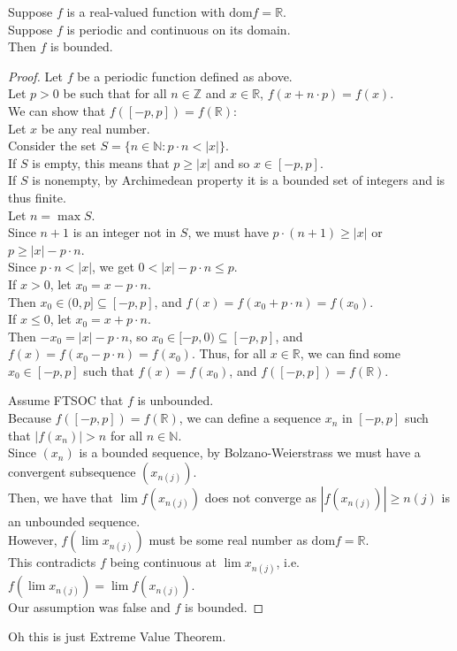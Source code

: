 \documentclass{article}
\newenvironment{theorem}[1]{\renewcommand\theinnercustomthm{#1}\innercustomthm}
  {\endinnercustomthm}
\begin{document}
\newpage{}
\begin{theorem}{6}
    Suppose $f$ is a real-valued function with $\mathrm{dom}f = \mathbb R$. \\
    Suppose $f$ is periodic and continuous on its domain. \\
    Then $f$ is bounded.
\end{theorem}
\begin{proof}
    Let $f$ be a periodic function defined as above. \\
    Let $p > 0$ be such that for all $n \in \mathbb Z$ and $x \in \mathbb R$, $f(x+n \cdot p) = f(x)$. \\
    We can show that $f([-p,p]) = f(\mathbb R)$: \\
    Let $x$ be any real number. \\
    Consider the set $S = \{ n \in \mathbb N : p\cdot n < |x|\}$. \\
    If $S$ is empty, this means that $p \ge |x|$ and so $x \in [-p, p]$. \\
    If $S$ is nonempty, by Archimedean property it is a bounded set of integers and is thus finite. \\
    Let $n = \max S$. \\
    Since $n+1$ is an integer not in $S$, we must have $p\cdot(n+1)\ge |x|$ or $p \ge |x| - p\cdot n$. \\
    Since $p \cdot n < |x|$, we get $0 <|x|-p\cdot n \le p$. \\
    If $x>0$, let $x_0 = x - p\cdot n$. \\
    Then $x_0 \in (0,p] \subseteq [-p,p]$, and $f(x)=f(x_0+p\cdot n)=f(x_0)$. \\
    If $x \le 0$, let $x_0 = x+p\cdot n$. \\
    Then $-x_0 = |x|-p\cdot n$, so $x_0 \in [-p,0) \subseteq [-p,p]$, and $f(x)=f(x_0-p\cdot n)=f(x_0)$.
    Thus, for all $x\in \mathbb R$, we can find some $x_0 \in [-p,p]$ such that $f(x)=f(x_0)$, and $f([-p,p]) = f(\mathbb R)$.
    
    Assume FTSOC that $f$ is unbounded. \\
    Because $f([-p,p]) = f(\mathbb R)$, we can define a sequence $x_n$ in $[-p,p]$ such that $|f(x_n)|>n$ for all $n \in \mathbb N$. \\
    Since $(x_n)$ is a bounded sequence, by Bolzano-Weierstrass we must have a convergent subsequence $(x_{n(j)})$. \\
    Then, we have that $\lim f(x_{n(j)})$ does not converge as $|f(x_{n(j)})| \ge n(j)$ is an unbounded sequence. \\
    However, $f(\lim x_{n(j)})$ must be some real number as $\mathrm{dom} f = \mathbb R$. \\
    This contradicts $f$ being continuous at $\lim x_{n(j)}$, i.e. $f(\lim x_{n(j)}) = \lim f(x_{n(j)})$. \\
    Our assumption was false and $f$ is bounded.
\end{proof}

Oh this is just Extreme Value Theorem.
\end{document}
